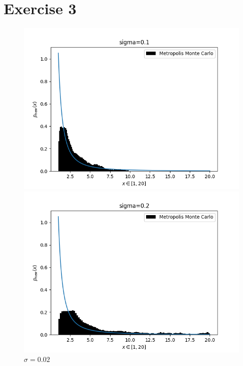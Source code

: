 \documentclass[12pt]{article}
\begin{document}
\newpage
\section*{Exercise 3}

\begin{figure}[h]
    \centering
    \begin{minipage}{0.47\textwidth}
        \includegraphics[width=1.2\textwidth]{figures/ex3_sigma01.png}
        \caption{$\sigma = 0.01$}
    \end{minipage}
    \hfill
    \begin{minipage}{0.47\textwidth}
        \includegraphics[width=1.2\textwidth]{figures/ex3_sigma02.png}
        \caption{$\sigma = 0.02$}
    \end{minipage}
\end{figure}
\end{document}
